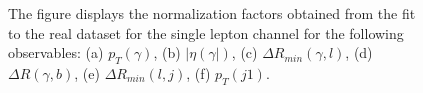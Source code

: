 \begin{figure}[ht]
  \quad
  \caption{ The figure displays the normalization factors obtained from the fit to the real dataset for the single 
  lepton channel for the following observables: (a) $p_T(\gamma)$, (b) $|\eta(\gamma|)$, 
  (c) $\Delta R_{min}(\gamma, l)$, (d) $\Delta R(\gamma, b)$, (e) $\Delta R_{min}(l, j)$, (f) $p_T(j1)$.}
  \label{fig:pt_unfolded_ljet_table_realdata}
\end{figure}
\FloatBarrier


